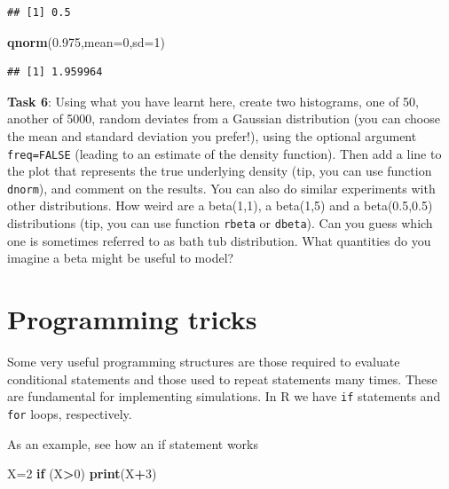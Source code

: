 \documentclass[
]{article}
\newenvironment{Shaded}{\begin{snugshade}}{\end{snugshade}}
\newcommand{\AttributeTok}[1]{\textcolor[rgb]{0.13,0.29,0.53}{#1}}
\newcommand{\ControlFlowTok}[1]{\textcolor[rgb]{0.13,0.29,0.53}{\textbf{#1}}}
\newcommand{\DecValTok}[1]{\textcolor[rgb]{0.00,0.00,0.81}{#1}}
\newcommand{\FloatTok}[1]{\textcolor[rgb]{0.00,0.00,0.81}{#1}}
\newcommand{\FunctionTok}[1]{\textcolor[rgb]{0.13,0.29,0.53}{\textbf{#1}}}
\newcommand{\NormalTok}[1]{#1}
\newcommand{\OtherTok}[1]{\textcolor[rgb]{0.56,0.35,0.01}{#1}}
\newcommand{\SpecialCharTok}[1]{\textcolor[rgb]{0.81,0.36,0.00}{\textbf{#1}}}
\begin{document}
\begin{verbatim}
## [1] 0.5
\end{verbatim}

\begin{Shaded}
\begin{Highlighting}[]
\FunctionTok{qnorm}\NormalTok{(}\FloatTok{0.975}\NormalTok{,}\AttributeTok{mean=}\DecValTok{0}\NormalTok{,}\AttributeTok{sd=}\DecValTok{1}\NormalTok{)}
\end{Highlighting}
\end{Shaded}

\begin{verbatim}
## [1] 1.959964
\end{verbatim}

\textbf{Task 6}: Using what you have learnt here, create two histograms,
one of 50, another of 5000, random deviates from a Gaussian distribution
(you can choose the mean and standard deviation you prefer!), using the
optional argument \texttt{freq=FALSE} (leading to an estimate of the
density function). Then add a line to the plot that represents the true
underlying density (tip, you can use function \texttt{dnorm}), and
comment on the results. You can also do similar experiments with other
distributions. How weird are a beta(1,1), a beta(1,5) and a
beta(0.5,0.5) distributions (tip, you can use function \texttt{rbeta} or
\texttt{dbeta}). Can you guess which one is sometimes referred to as
bath tub distribution. What quantities do you imagine a beta might be
useful to model?

\section{Programming tricks}\label{programming-tricks}

Some very useful programming structures are those required to evaluate
conditional statements and those used to repeat statements many times.
These are fundamental for implementing simulations. In R we have
\texttt{if} statements and \texttt{for} loops, respectively.

As an example, see how an if statement works

\begin{Shaded}
\begin{Highlighting}[]
\NormalTok{X}\OtherTok{=}\DecValTok{2}
\ControlFlowTok{if}\NormalTok{ (X}\SpecialCharTok{\textgreater{}}\DecValTok{0}\NormalTok{) }\FunctionTok{print}\NormalTok{(X}\SpecialCharTok{+}\DecValTok{3}\NormalTok{)}
\end{Highlighting}
\end{Shaded}
\end{document}
